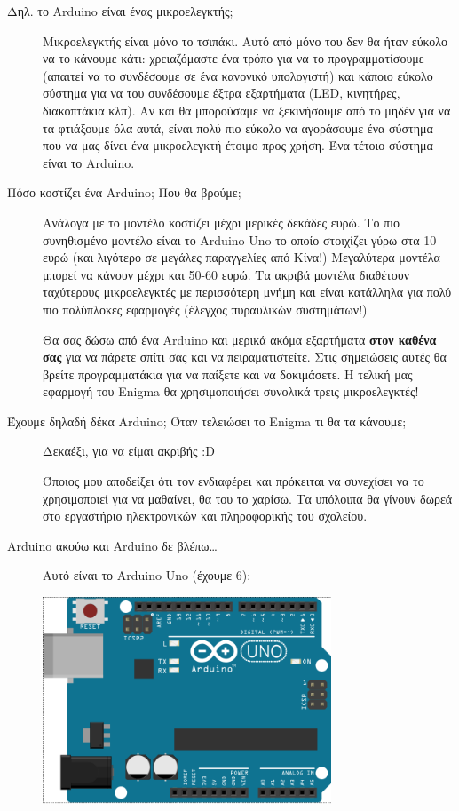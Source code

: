 \documentclass[a4paper,twoside,12pt]{article}
\begin{document}
\begin{description}
\item[Δηλ. το Arduino είναι ένας μικροελεγκτής;]
%
Μικροελεγκτής είναι μόνο το τσιπάκι. Αυτό από μόνο του δεν θα ήταν εύκολο να το κάνουμε κάτι: χρειαζόμαστε ένα τρόπο για να το προγραμματίσουμε (απαιτεί να το συνδέσουμε σε ένα κανονικό υπολογιστή) και κάποιο εύκολο σύστημα για να του συνδέσουμε έξτρα εξαρτήματα (LED, κινητήρες, διακοπτάκια κλπ). Αν και θα μπορούσαμε να ξεκινήσουμε από το μηδέν για να τα φτιάξουμε όλα αυτά, είναι πολύ πιο εύκολο να αγοράσουμε ένα σύστημα που να μας δίνει ένα μικροελεγκτή έτοιμο προς χρήση. Ένα τέτοιο σύστημα είναι το Arduino.

\item[Πόσο κοστίζει ένα Arduino; Που θα βρούμε;]
%
Ανάλογα με το μοντέλο κοστίζει μέχρι μερικές δεκάδες ευρώ. Το πιο συνηθισμένο μοντέλο είναι το Arduino Uno το οποίο στοιχίζει γύρω στα 10 ευρώ (και λιγότερο σε μεγάλες παραγγελίες από Κίνα!) Μεγαλύτερα μοντέλα μπορεί να κάνουν μέχρι και 50-60 ευρώ. Τα ακριβά μοντέλα διαθέτουν ταχύτερους μικροελεγκτές με περισσότερη μνήμη και είναι κατάλληλα για πολύ πιο πολύπλοκες εφαρμογές (έλεγχος πυραυλικών συστημάτων!)

Θα σας δώσω από ένα Arduino και μερικά ακόμα εξαρτήματα \textbf{στον καθένα σας} για να πάρετε σπίτι σας και να πειραματιστείτε. Στις σημειώσεις αυτές θα βρείτε προγραμματάκια για να παίξετε και να δοκιμάσετε. Η τελική μας εφαρμογή του Enigma θα χρησιμοποιήσει συνολικά τρεις μικροελεγκτές!

\item[Έχουμε δηλαδή δέκα Arduino; Όταν τελειώσει το Enigma τι θα τα κάνουμε;]

Δεκαέξι, για να είμαι ακριβής :D
 
Όποιος μου αποδείξει ότι τον ενδιαφέρει και πρόκειται να συνεχίσει να το χρησιμοποιεί για να μαθαίνει, θα του το χαρίσω. Τα υπόλοιπα θα γίνουν δωρεά στο εργαστήριο ηλεκτρονικών και πληροφορικής του σχολείου.

\item[Arduino ακούω και Arduino δε βλέπω\ldots]

Αυτό είναι το Arduino Uno (έχουμε 6):

\begin{center}
  \includegraphics[width=0.7\textwidth]{images/main/uno}
\end{center}


\end{description}
\end{document}
